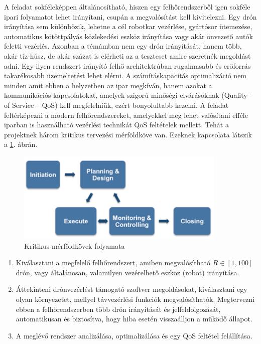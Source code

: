 A feladat sokféleképpen általánosítható, hiszen egy felhőrendszerből igen sokféle ipari folyamatot lehet irányítani, csupán a megvalósítást kell kivitelezni. Egy drón irányítása sem különbözik, lehetne a cél robotkar vezérlése, gyártósor ütemezése, automatikus kötöttpályás közlekedési eszköz irányítása vagy akár önvezető autók feletti vezérlés.
 Azonban a témámban nem egy drón irányítását, hanem több, akár tíz-húsz, de akár százat is elérheti az a teszteset amire szeretnék megoldást adni. Egy ilyen rendszert irányító felhő architektrúban rugalmasabb és erőforrás takarékosabb üzemeltetést lehet elérni. A számításkapacitás optimalizáció nem minden amit ebben a helyzetben az ipar megkíván, hanem azokat a kommunikációs kapcsolatokat, amelyek szigorú minőségi elvárásoknak (Quality -of Service – QoS) kell megfelelniük, ezért bonyolultabb kezelni. A feladat feltérképezni a modern felhőrendszereket, amelyekkel meg lehet valósítani efféle iparban is használható vezérlési technikát QoS feltételek mellett. Tehát a projektnek három kritikus tervezési mérföldköve van. Ezeknek kapcsolata látszik a \ref{fig:merfold}. ábrán.
\begin{figure}
	\centering
	\includegraphics[width=10cm]{figures/plan_excecute_monitor.png}
	\caption{Kritikus mérföldkövek folyamata \cite{ProjecPlan}}
	\label{fig:merfold}
\end{figure}
\begin{enumerate}
	\item Kiválasztani a megfelelő felhőrendszert, amiben megvalósítható $R\in [1, 100]$ drón, vagy általánosan, valamilyen vezérelhető eszköz (robot) irányítása.
	\item Áttekinteni drónvezérlést támogató szoftver megoldásokat, kiválasztani egy olyan környezetet, mellyel távvezérlési funkciók megvalósíthatók. Megtervezni ebben a felhőrendszerben több drón irányítását és jelfeldolgozását, automatikusan és biztosítva, hogy hiba esetén visszaálljon a működő állapot.
	\item A meglévő rendszer analizálása, optimalizálása és egy QoS feltétel felállítása.
\end{enumerate}


